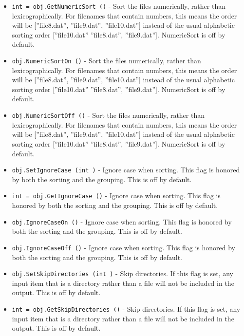 \begin{itemize}
\item  \verb|int = obj.GetNumericSort ()| -  Sort the files numerically, rather than lexicographically.
 For filenames that contain numbers, this means the order will be
 [''file8.dat'', ''file9.dat'', ''file10.dat'']
 instead of the usual alphabetic sorting order
 [''file10.dat'' ''file8.dat'', ''file9.dat''].
 NumericSort is off by default.

\item  \verb|obj.NumericSortOn ()| -  Sort the files numerically, rather than lexicographically.
 For filenames that contain numbers, this means the order will be
 [''file8.dat'', ''file9.dat'', ''file10.dat'']
 instead of the usual alphabetic sorting order
 [''file10.dat'' ''file8.dat'', ''file9.dat''].
 NumericSort is off by default.

\item  \verb|obj.NumericSortOff ()| -  Sort the files numerically, rather than lexicographically.
 For filenames that contain numbers, this means the order will be
 [''file8.dat'', ''file9.dat'', ''file10.dat'']
 instead of the usual alphabetic sorting order
 [''file10.dat'' ''file8.dat'', ''file9.dat''].
 NumericSort is off by default.

\item  \verb|obj.SetIgnoreCase (int )| -  Ignore case when sorting.  This flag is honored by both
 the sorting and the grouping. This is off by default.

\item  \verb|int = obj.GetIgnoreCase ()| -  Ignore case when sorting.  This flag is honored by both
 the sorting and the grouping. This is off by default.

\item  \verb|obj.IgnoreCaseOn ()| -  Ignore case when sorting.  This flag is honored by both
 the sorting and the grouping. This is off by default.

\item  \verb|obj.IgnoreCaseOff ()| -  Ignore case when sorting.  This flag is honored by both
 the sorting and the grouping. This is off by default.

\item  \verb|obj.SetSkipDirectories (int )| -  Skip directories. If this flag is set, any input item that
 is a directory rather than a file will not be included in
 the output.  This is off by default.

\item  \verb|int = obj.GetSkipDirectories ()| -  Skip directories. If this flag is set, any input item that
 is a directory rather than a file will not be included in
 the output.  This is off by default.


\end{itemize}
